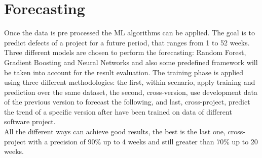 \documentclass{article}
\begin{document}
\section{Forecasting}
Once the data is pre processed the ML algorithms can be applied. The goal is to predict defects of a project for a future period, that ranges from 1 to 52 weeks.
Three different models are chosen to perform the forecasting: Random Forest, Gradient Boosting and Neural Networks and also some predefined framework will be taken into account for the result evaluation.
The training phase is applied using three different methodologies: the first, within scenario, apply training and prediction over the same dataset, the second, cross-version, use development data of the previous version to forecast the following, and last, cross-project, predict the trend of a specific version after have been trained on data of different software project.\\
All the different ways can achieve good results, the best is the last one, cross-project with a precision of 90\% up to 4 weeks and still greater than 70\% up to 20 weeks. 
\end{document}
